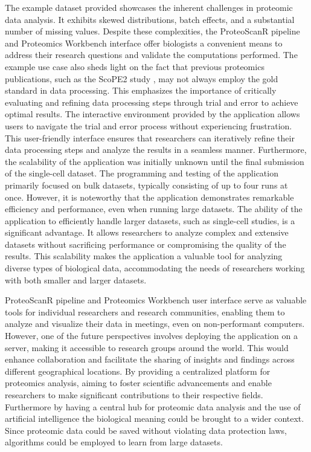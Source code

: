 \documentclass[
  11pt,
]{article}
\begin{document}
The example dataset provided showcases the inherent challenges in
proteomic data analysis. It exhibits skewed distributions, batch
effects, and a substantial number of missing values. Despite these
complexities, the ProteoScanR pipeline and Proteomics Workbench
interface offer biologists a convenient means to address their research
questions and validate the computations performed. The example use case
also sheds light on the fact that previous proteomics publications, such
as the ScoPE2 study \citep{Specht2021}, may not always employ the gold
standard in data processing. This emphasizes the importance of
critically evaluating and refining data processing steps through trial
and error to achieve optimal results. The interactive environment
provided by the application allows users to navigate the trial and error
process without experiencing frustration. This user-friendly interface
ensures that researchers can iteratively refine their data processing
steps and analyze the results in a seamless manner. Furthermore, the
scalability of the application was initially unknown until the final
submission of the single-cell dataset. The programming and testing of
the application primarily focused on bulk datasets, typically consisting
of up to four runs at once. However, it is noteworthy that the
application demonstrates remarkable efficiency and performance, even
when running large datasets. The ability of the application to
efficiently handle larger datasets, such as single-cell studies, is a
significant advantage. It allows researchers to analyze complex and
extensive datasets without sacrificing performance or compromising the
quality of the results. This scalability makes the application a
valuable tool for analyzing diverse types of biological data,
accommodating the needs of researchers working with both smaller and
larger datasets.

ProteoScanR pipeline and Proteomics Workbench user interface serve as
valuable tools for individual researchers and research communities,
enabling them to analyze and visualize their data in meetings, even on
non-performant computers. However, one of the future perspectives
involves deploying the application on a server, making it accessible to
research groups around the world. This would enhance collaboration and
facilitate the sharing of insights and findings across different
geographical locations. By providing a centralized platform for
proteomics analysis, aiming to foster scientific advancements and enable
researchers to make significant contributions to their respective
fields. Furthermore by having a central hub for proteomic data analysis
and the use of artificial intelligence the biological meaning could be
brought to a wider context. Since proteomic data could be saved without
violating data protection laws, algorithms could be employed to learn
from large datasets.
\end{document}
